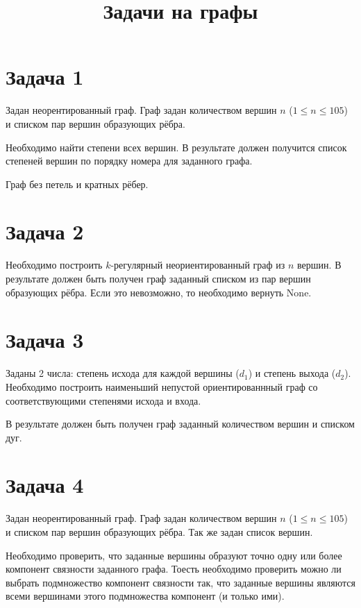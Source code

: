 \documentclass[14pt]{extarticle}
\date{}
\title{Задачи на графы}
\begin{document}
\section*{Задача 1}
\label{sec:orgec1537c}
Задан неорентированный граф.
Граф задан количеством вершин \(n\) (\(1 \leq n \leq 105\)) и
списком пар вершин образующих рёбра.

Необходимо найти степени всех
вершин.
В результате должен получится список
степеней вершин по порядку номера для заданного графа.

Граф без петель и кратных рёбер.

\section*{Задача 2}
\label{sec:org541444b}
Необходимо построить \(k\text{-регулярный}\) неориентированный граф из \(n\) вершин.
В результате должен быть получен граф заданный списком из пар вершин образующих
рёбра.
Если это невозможно, то необходимо вернуть None.

\section*{Задача 3}
\label{sec:org75c2ce4}
Заданы 2 числа: степень исхода для каждой вершины (\(d_{1}\)) и степень выхода (\(d_{2}\)).
Необходимо построить наименьший непустой ориентированнный граф со соответствующими
степенями исхода и входа.

В результате должен быть получен граф заданный количеством вершин и списком дуг.

\section*{Задача 4}
\label{sec:org1f5a5f7}
Задан неорентированный граф.
Граф задан количеством вершин \(n\) (\(1 \leq n \leq 105\)) и
списком пар вершин образующих рёбра.
Так же задан список вершин.

Необходимо проверить, что заданные вершины образуют точно одну или более
компонент связности заданного графа.
Тоесть необходимо проверить можно ли выбрать подмножество компонент связности так,
что заданные вершины являются всеми вершинами этого подмножества компонент (и только ими).
\end{document}
